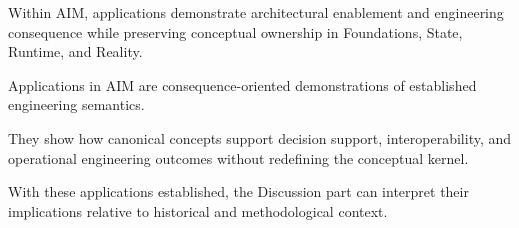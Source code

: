 \begin{principle}
\label{princ:application-principle}
Within AIM, applications demonstrate architectural enablement and
engineering consequence while preserving conceptual ownership in
Foundations, State, Runtime, and Reality.
\end{principle}

\begin{summary}
Applications in AIM are consequence-oriented demonstrations of established
engineering semantics.

They show how canonical concepts support decision support,
interoperability, and operational engineering outcomes without
redefining the conceptual kernel.
\end{summary}

With these applications established, the Discussion part can interpret
their implications relative to historical and methodological context.
